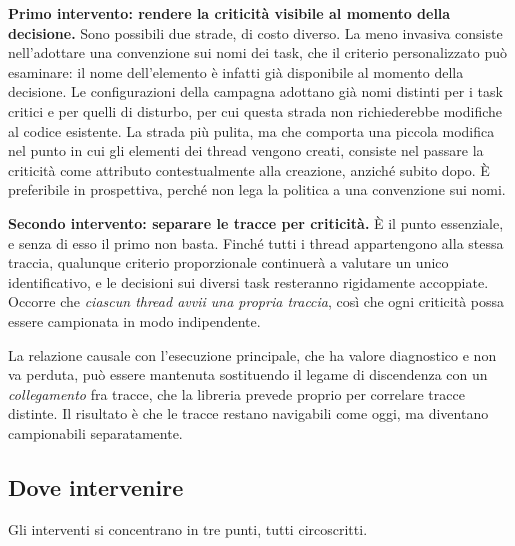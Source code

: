 \textbf{Primo intervento: rendere la criticit\`a visibile al momento della decisione.} Sono
possibili due strade, di costo diverso. La meno invasiva consiste nell'adottare una convenzione sui
nomi dei task, che il criterio personalizzato pu\`o esaminare: il nome dell'elemento \`e infatti
gi\`a disponibile al momento della decisione. Le configurazioni della campagna adottano gi\`a nomi
distinti per i task critici e per quelli di disturbo, per cui questa strada non richiederebbe
modifiche al codice esistente. La strada pi\`u pulita, ma che comporta una piccola modifica nel
punto in cui gli elementi dei thread vengono creati, consiste nel passare la criticit\`a come
attributo contestualmente alla creazione, anzich\'e subito dopo. \`E preferibile in prospettiva,
perch\'e non lega la politica a una convenzione sui nomi.

\textbf{Secondo intervento: separare le tracce per criticit\`a.} \`E il punto essenziale, e senza
di esso il primo non basta. Finch\'e tutti i thread appartengono alla stessa traccia, qualunque
criterio proporzionale continuer\`a a valutare un unico identificativo, e le decisioni sui diversi
task resteranno rigidamente accoppiate. Occorre che \emph{ciascun thread avvii una propria traccia},
cos\`i che ogni criticit\`a possa essere campionata in modo indipendente.

La relazione causale con l'esecuzione principale, che ha valore diagnostico e non va perduta, pu\`o
essere mantenuta sostituendo il legame di discendenza con un \emph{collegamento} fra tracce, che la
libreria prevede proprio per correlare tracce distinte. Il risultato \`e che le tracce restano
navigabili come oggi, ma diventano campionabili separatamente.

\subsection{Dove intervenire}

Gli interventi si concentrano in tre punti, tutti circoscritti.

